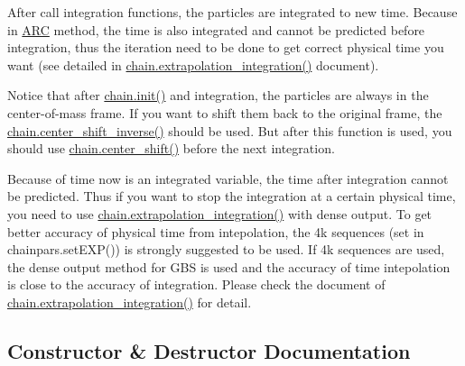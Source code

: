 \begin{DoxyEnumerate}
\item After call integration functions, the particles are integrated to new time. Because in \hyperlink{namespaceARC}{A\+RC} method, the time is also integrated and cannot be predicted before integration, thus the iteration need to be done to get correct physical time you want (see detailed in \hyperlink{classARC_1_1chain_ae4d0002cceee2397101a43b3755f927e}{chain.\+extrapolation\+\_\+integration()} document).
\item Notice that after \hyperlink{classARC_1_1chain_a3fe37720ceb48c14905c92d3e25e71a4}{chain.\+init()} and integration, the particles are always in the center-\/of-\/mass frame. If you want to shift them back to the original frame, the \hyperlink{classARC_1_1chain_a7bd0d1b03bcc2e7cdb146960e9d55ea3}{chain.\+center\+\_\+shift\+\_\+inverse()} should be used. But after this function is used, you should use \hyperlink{classARC_1_1chain_a73419f14f724668f4858a13c01cf7b70}{chain.\+center\+\_\+shift()} before the next integration.
\end{DoxyEnumerate}

Because of time now is an integrated variable, the time after integration cannot be predicted. Thus if you want to stop the integration at a certain physical time, you need to use \hyperlink{classARC_1_1chain_ae4d0002cceee2397101a43b3755f927e}{chain.\+extrapolation\+\_\+integration()} with dense output. To get better accuracy of physical time from intepolation, the 4k sequences (set in chainpars.\+set\+E\+X\+P()) is strongly suggested to be used. If 4k sequences are used, the dense output method for G\+BS is used and the accuracy of time intepolation is close to the accuracy of integration. Please check the document of \hyperlink{classARC_1_1chain_ae4d0002cceee2397101a43b3755f927e}{chain.\+extrapolation\+\_\+integration()} for detail. 

\subsection{Constructor \& Destructor Documentation}
\hypertarget{classARC_1_1chain_a94d6f22a673c1b750b81bb7e21ff03ab}{}\label{classARC_1_1chain_a94d6f22a673c1b750b81bb7e21ff03ab} 
